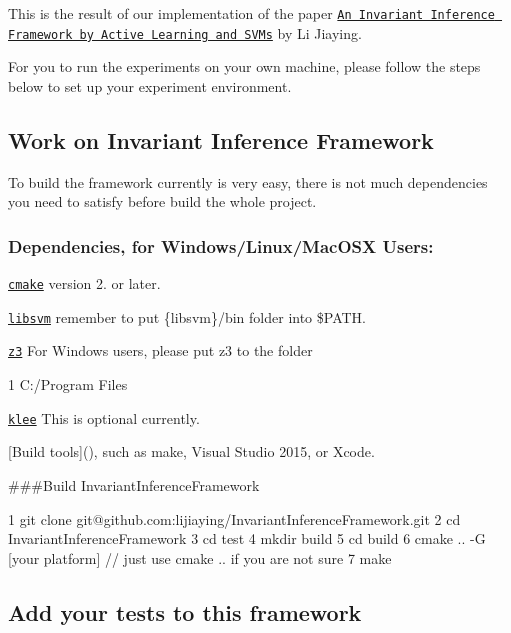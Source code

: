 This is the result of our implementation of the paper \href{../../Papers/AInvariantInferenceFrameworkbyActiveLearningandSVMs.pdf}{\tt An Invariant Inference Framework by Active Learning and S\+V\+Ms} by Li Jiaying.

For you to run the experiments on your own machine, please follow the steps below to set up your experiment environment.

\subsection*{Work on Invariant Inference Framework}

To build the framework currently is very easy, there is not much dependencies you need to satisfy before build the whole project.

\subsubsection*{Dependencies, for Windows/\+Linux/\+Mac\+O\+SX Users\+:}


\begin{DoxyItemize}
\item \href{https://cmake.org/}{\tt cmake} version 2. or later.
\item \href{https://www.csie.ntu.edu.tw/~cjlin/libsvm/}{\tt libsvm} remember to put \{libsvm\}/bin folder into \$\+P\+A\+TH.
\item \href{https://github.com/Z3Prover/z3}{\tt z3} For Windows users, please put z3 to the folder 
\begin{DoxyCode}
1 C:/Program Files
\end{DoxyCode}

\item \href{https://klee.github.io/}{\tt klee} This is optional currently.
\item \mbox{[}Build tools\mbox{]}(), such as make, Visual Studio 2015, or Xcode.
\end{DoxyItemize}

\#\#\#\+Build Invariant\+Inference\+Framework 
\begin{DoxyCode}
1 git clone git@github.com:lijiaying/InvariantInferenceFramework.git
2 cd InvariantInferenceFramework
3 cd test
4 mkdir build
5 cd build
6 cmake .. -G [your platform]  // just use cmake .. if you are not sure
7 make
\end{DoxyCode}


\subsection*{Add your tests to this framework}

